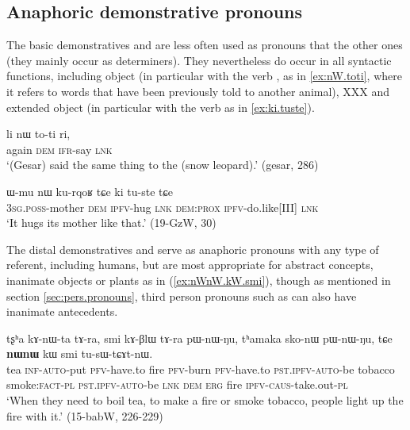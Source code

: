 \subsection{Anaphoric demonstrative pronouns} \label{sec:anaphoric.demonstrative.pro}

The basic demonstratives  and  are less often used as pronouns that the other ones (they mainly occur as determiners). They nevertheless do occur in all syntactic functions, including object (in particular with the verb , as in \ref{ex:nW.toti}, where it refers to words that have been previously told to another animal), XXX and extended object (in particular with the verb  as in \ref{ex:ki.tuste}).

\begin{exe}
\ex \label{ex:nW.toti}
 \gll  li nɯ to-ti ri, \\
 again \textsc{dem} \textsc{ifr}-say \textsc{lnk} \\
\glt `(Gesar) said the same thing to the (snow leopard).' (gesar, 286)
\end{exe}

\begin{exe}
\ex \label{ex:ki.tuste}
 \gll ɯ-mu nɯ ku-rqoʁ tɕe ki tu-ste tɕe \\
\textsc{3sg.poss}-mother  \textsc{dem} \textsc{ipfv}-hug \textsc{lnk} \textsc{dem:prox} \textsc{ipfv}-do.like[III] \textsc{lnk} \\
\glt `It hugs its mother like that.' (19-GzW, 30)
\end{exe}

The distal demonstratives  and  serve as anaphoric pronouns with any type of referent, including humans, but are most appropriate for abstract concepts, inanimate objects or plants as in (\ref{ex:nWnW.kW.smi}), though as mentioned in section \ref{sec:pers.pronouns},  third person pronouns such as  can also have inanimate antecedents.

\begin{exe}
\ex \label{ex:nWnW.kW.smi}
 \gll tʂʰa kɤ-nɯ-ta tɤ-ra, smi kɤ-βlɯ tɤ-ra pɯ-nɯ-ŋu, tʰamaka sko-nɯ pɯ-nɯ-ŋu, tɕe \textbf{nɯnɯ} kɯ smi tu-sɯ-tɕɤt-nɯ. \\
 tea \textsc{inf}-\textsc{auto}-put \textsc{pfv}-have.to fire  \textsc{pfv}-burn \textsc{pfv}-have.to \textsc{pst.ipfv-auto}-be tobacco smoke:\textsc{fact}-\textsc{pl} \textsc{pst.ipfv-auto}-be \textsc{lnk} \textsc{dem} \textsc{erg} fire \textsc{ipfv}-\textsc{caus}-take.out-\textsc{pl} \\
 \glt `When they need to boil tea, to make a fire or smoke tobacco, people light up the fire with it.' (15-babW, 226-229)
\end{exe}

